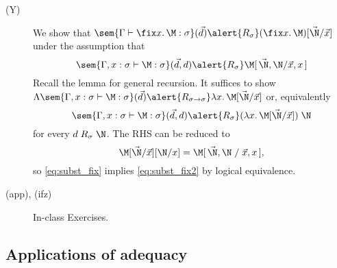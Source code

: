 \begin{frame}
  \begin{description}
    \item[(Y)] We show that
      $\sem{\Gamma \vdash \fix x.\, \M : \sigma}(\vec{d})
        \alert{\mathrel{R_\sigma}}
        (\fix x.\,\M)[\vec{\N}/\vec{x}]$
      under the assumption that
      \begin{equation}
        \label{eq:subst_fix}
        \sem{\Gamma, x : \sigma \vdash \M : \sigma}(\vec{d}, d)
        \alert{\mathrel{R_\sigma}}
        \M[\,\vec{\N}, \N/\vec{x}, x\,]
      \end{equation}
      Recall the lemma for general recursion. It suffices to show
      $\Lambda\sem{\Gamma, x : \sigma \vdash \M : \sigma}(\vec{d})
      \alert{\mathrel{R_{\sigma\to\sigma}}}
        \lambda x.\, \M[\vec{\N}/ \vec{x}] $
      or, equivalently 
      \begin{equation}
        \label{eq:subst_fix2}
        \sem{\Gamma, x : \sigma \vdash \M : \sigma}(\vec{d}, d)
        \alert{\mathrel{R_{\sigma}}}
        (\lambda x.\, \M[\vec{\N}/\vec{x}])\;\N
      \end{equation}
      for every $d \mathrel{R}_\sigma \N$.
      The RHS can be reduced to
      \[
        \M[\vec{\N}/\vec{x}][\N/x]
        = \M[\,\vec{\N}, \N\mathrel{/}\vec{x}, x\,],
      \]
      so \eqref{eq:subst_fix} implies 
      \eqref{eq:subst_fix2} by logical equivalence.
    \item[(app), (ifz)] In-class Exercises. 
  \end{description}
\end{frame}

\subsection{Applications of adequacy}

